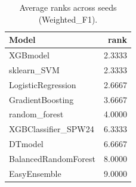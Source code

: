 \begin{table}[t]
\centering
\begin{tabular}{lr}
\toprule
Model & rank \\
\midrule
XGBmodel & 2.3333 \\
sklearn_SVM & 2.3333 \\
LogisticRegression & 2.6667 \\
GradientBoosting & 3.6667 \\
random_forest & 4.0000 \\
XGBClassifier_SPW24 & 6.3333 \\
DTmodel & 6.6667 \\
BalancedRandomForest & 8.0000 \\
EasyEnsemble & 9.0000 \\
\bottomrule
\end{tabular}
\caption{Average ranks across seeds (Weighted_F1).}
\label{tab:avg_rank_Weighted_F1}
\end{table}